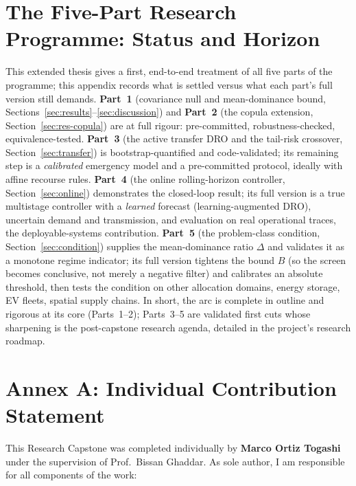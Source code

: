 \documentclass[12pt]{article}
\begin{document}
\section{The Five-Part Research Programme: Status and Horizon}\label{app:programme}
This extended thesis gives a first, end-to-end treatment of all five parts of the
programme; this appendix records what is settled versus what each part's full version
still demands. \textbf{Part~1} (covariance null and mean-dominance bound,
Sections~\ref{sec:results}--\ref{sec:discussion}) and \textbf{Part~2} (the copula
extension, Section~\ref{sec:res-copula}) are at full rigour: pre-committed,
robustness-checked, equivalence-tested. \textbf{Part~3} (the active transfer DRO and
the tail-risk crossover, Section~\ref{sec:transfer}) is bootstrap-quantified and
code-validated; its remaining step is a \emph{calibrated} emergency model and a
pre-committed protocol, ideally with affine recourse rules. \textbf{Part~4} (the
online rolling-horizon controller, Section~\ref{sec:online}) demonstrates the
closed-loop result; its full version is a true multistage controller with a
\emph{learned} forecast (learning-augmented DRO), uncertain demand and transmission,
and evaluation on real operational traces, the deployable-systems contribution.
\textbf{Part~5} (the problem-class condition, Section~\ref{sec:condition}) supplies the
mean-dominance ratio $\Delta$ and validates it as a monotone regime indicator; its full
version tightens the bound $B$ (so the screen becomes conclusive, not merely a negative
filter) and calibrates an absolute threshold, then tests the condition on other
allocation domains, energy storage, EV fleets, spatial supply chains. In short, the
arc is complete in outline and rigorous at its core (Parts~1--2); Parts~3--5 are
validated first cuts whose sharpening is the post-capstone research agenda, detailed in
the project's research roadmap.

\section*{Annex A: Individual Contribution Statement}\label{app:ics}

This Research Capstone was completed individually by \textbf{Marco Ortiz Togashi}
under the supervision of Prof.\ Bissan Ghaddar. As sole author, I am responsible
for all components of the work:
\end{document}
